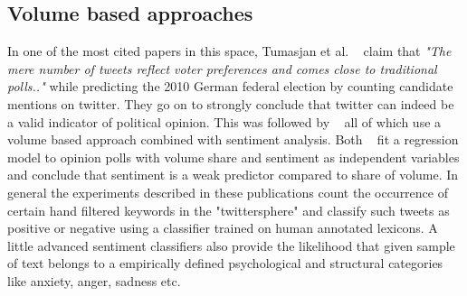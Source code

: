 \documentclass{article}
\begin{document}
\subsection{Volume based approaches}
In one of the most cited papers in this space, Tumasjan et al.  ~\cite{tumasjan2010predicting}
claim that \emph{ "The mere number of tweets reflect voter preferences and comes close to 
traditional polls.."} while predicting  the 2010 German federal election by counting
candidate mentions on twitter. 
They go on to strongly conclude that twitter can indeed be a valid indicator of political opinion. 
This was followed by ~\cite{o2010tweets,saez2011total,bermingham2011using,demartini2011analyzing}
all of which use a volume based approach combined with sentiment analysis. 
Both ~\cite{o2010tweets,bermingham2011using} fit a regression model to opinion polls with 
volume share and sentiment as independent variables and conclude that sentiment is a weak predictor
compared to share of volume. 
In general the experiments described in these publications count the occurrence of certain hand
filtered keywords in the "twittersphere" and classify such tweets as positive or negative using
a classifier trained on human annotated lexicons.
A little advanced sentiment classifiers also provide the likelihood that given sample of text
belongs to a empirically defined psychological and structural categories like anxiety, anger,
sadness etc. 
\end{document}
